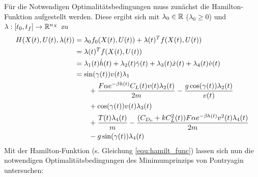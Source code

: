 Für die Notwendigen Optimalitätsbedingungen muss zunächst die Hamilton-Funktion aufgestellt werden. Diese ergibt sich mit $\lambda_0 \in \mathbb{R}$ ($\lambda_0 \geq 0$) und $\lambda : [t_0,t_f] \to \mathbb{R}^{n_X}$ zu
\begin{equation} \label{equ:hamilt_func}
    \begin{split}
        H(X(t),U(t),\lambda(t)) &= \lambda_0 f_0(X(t),U(t)) + \lambda(t)^T f(X(t),U(t)) \\\
        &= \lambda(t)^T f(X(t),U(t)) \\\
        &= \lambda_1(t) \dot{h}(t) + \lambda_2(t) \dot{\gamma}(t) + \lambda_3(t) \dot{x}(t) + \lambda_4(t) \dot{v}(t) \\\
        &= \sin(\gamma(t)) v(t) \lambda_1 \\\
        &\hspace{7mm} + \dfrac{F \alpha e^{-\beta h(t)} C_L(t) v(t) \lambda_2(t)}{2m} - \dfrac{g \cos(\gamma(t)) \lambda_2(t)}{v(t)} \\\
        &\hspace{7mm} + \cos(\gamma(t)) v(t) \lambda_3(t) \\\
        &\hspace{7mm} + \dfrac{T(t) \lambda_4(t)}{m} - \dfrac{(C_{D_0} + k C_L^2(t)) F \alpha e^{-\beta h(t)} v^2(t) \lambda_4(t)}{2m} \\\
        &\hspace{7mm} - g \sin(\gamma(t)) \lambda_4(t)
    \end{split}
\end{equation}
Mit der Hamilton-Funktion (s. Gleichung \ref{equ:hamilt_func}) lassen sich nun die notwendigen Optimalitätsbedingungen des Minimumprinzips von Pontryagin untersuchen:
